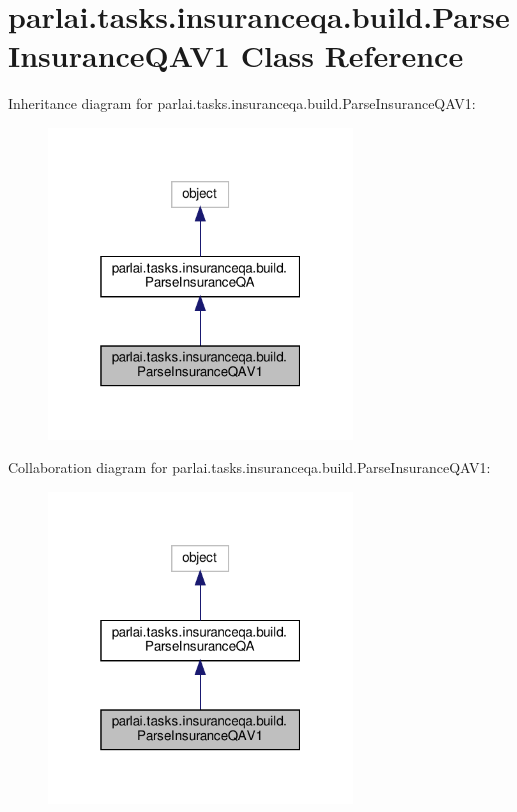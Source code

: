 \hypertarget{classparlai_1_1tasks_1_1insuranceqa_1_1build_1_1ParseInsuranceQAV1}{}\section{parlai.\+tasks.\+insuranceqa.\+build.\+Parse\+Insurance\+Q\+A\+V1 Class Reference}
\label{classparlai_1_1tasks_1_1insuranceqa_1_1build_1_1ParseInsuranceQAV1}


Inheritance diagram for parlai.\+tasks.\+insuranceqa.\+build.\+Parse\+Insurance\+Q\+A\+V1\+:\nopagebreak
\begin{figure}[H]
\begin{center}
\leavevmode
\includegraphics[width=229pt]{df/db2/classparlai_1_1tasks_1_1insuranceqa_1_1build_1_1ParseInsuranceQAV1__inherit__graph}
\end{center}
\end{figure}


Collaboration diagram for parlai.\+tasks.\+insuranceqa.\+build.\+Parse\+Insurance\+Q\+A\+V1\+:
\nopagebreak
\begin{figure}[H]
\begin{center}
\leavevmode
\includegraphics[width=229pt]{d6/df0/classparlai_1_1tasks_1_1insuranceqa_1_1build_1_1ParseInsuranceQAV1__coll__graph}
\end{center}
\end{figure}
